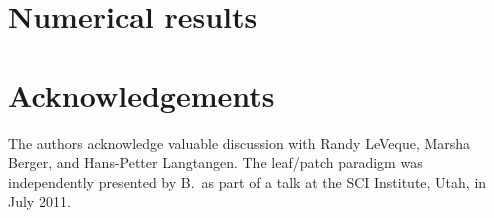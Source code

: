 \documentclass{IOS-Book-Article}     %
\begin{document}
\section{Numerical results}



\section*{Acknowledgements}

The authors acknowledge valuable discussion with Randy LeVeque, Marsha Berger,
and Hans-Petter Langtangen.  The leaf/patch paradigm was independently presented
by B.\ as part of a talk at the SCI Institute, Utah, in July 2011.




\end{document}
